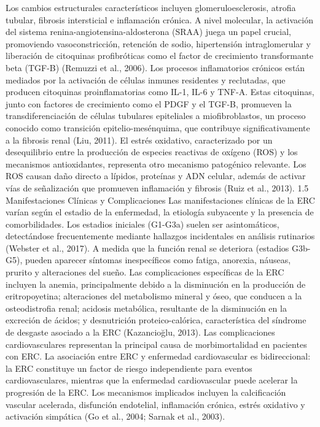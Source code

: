 \documentclass{article}
\begin{document}
\begin{multicols}{2}
Los cambios estructurales característicos incluyen
glomeruloesclerosis, atrofia tubular, fibrosis intersticial
e inflamación crónica. A nivel molecular, la activación del
sistema renina-angiotensina-aldosterona (SRAA) juega un
papel crucial, promoviendo vasoconstricción, retención de
sodio, hipertensión intraglomerular y liberación de
citoquinas profibróticas como el factor de crecimiento
transformante beta (TGF-B) (Remuzzi et al., 2006).
Los procesos inflamatorios crónicos están mediados por la
activación de células inmunes residentes y reclutadas, que
producen citoquinas proinflamatorias como IL-1, IL-6 y
TNF-A. Estas citoquinas, junto con factores de crecimiento
como el PDGF y el TGF-B, promueven la transdiferenciación de
células tubulares epiteliales a miofibroblastos, un proceso
conocido como transición epitelio-mesénquima, que contribuye
significativamente a la fibrosis renal (Liu, 2011).
El estrés oxidativo, caracterizado por un desequilibrio
entre la producción de especies reactivas de oxígeno (ROS) y
los mecanismos antioxidantes, representa otro mecanismo
patogénico relevante. Los ROS causan daño directo a lípidos,
proteínas y ADN celular, además de activar vías de
señalización que promueven inflamación y fibrosis (Ruiz et
al., 2013).
 1.5 Manifestaciones Clínicas y Complicaciones
Las manifestaciones clínicas de la ERC varían según el estadio de la enfermedad, la etiología subyacente y la presencia de comorbilidades. Los estadios iniciales (G1-G3a) suelen ser asintomáticos, detectándose frecuentemente mediante hallazgos incidentales en análisis rutinarios (Webster et al., 2017).
A medida que la función renal se deteriora (estadios G3b-G5), pueden aparecer síntomas inespecíficos como fatiga, anorexia, náuseas, prurito y alteraciones del sueño. Las complicaciones específicas de la ERC incluyen la anemia, principalmente debido a la disminución en la producción de eritropoyetina; alteraciones del metabolismo mineral y óseo, que conducen a la osteodistrofia renal; acidosis metabólica, resultante de la disminución en la excreción de ácidos; y desnutrición proteico-calórica, característica del síndrome de desgaste asociado a la ERC (Kazancioğlu, 2013).
Las complicaciones cardiovasculares representan la principal causa de morbimortalidad en pacientes con ERC. La asociación entre ERC y enfermedad cardiovascular es bidireccional: la ERC constituye un factor de riesgo independiente para eventos cardiovasculares, mientras que la enfermedad cardiovascular puede acelerar la progresión de la ERC. Los mecanismos implicados incluyen la calcificación vascular acelerada, disfunción endotelial, inflamación crónica, estrés oxidativo y activación simpática (Go et al., 2004; Sarnak et al., 2003).

\end{multicols}
\end{document}
